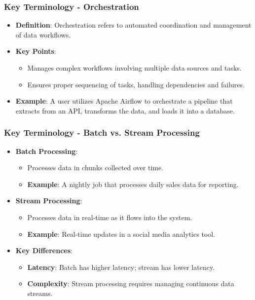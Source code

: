 \documentclass[aspectratio=169]{beamer}
\begin{document}
\begin{frame}[fragile]
    \frametitle{Key Terminology - Orchestration}
    \begin{itemize}
        \item \textbf{Definition}: 
        Orchestration refers to automated coordination and management of data workflows.
        \item \textbf{Key Points}:
        \begin{itemize}
            \item Manages complex workflows involving multiple data sources and tasks.
            \item Ensures proper sequencing of tasks, handling dependencies and failures.
        \end{itemize}
        \item \textbf{Example}: 
        A user utilizes Apache Airflow to orchestrate a pipeline that extracts from an API, transforms the data, and loads it into a database.
    \end{itemize}
\end{frame}

\begin{frame}[fragile]
    \frametitle{Key Terminology - Batch vs. Stream Processing}
    \begin{itemize}
        \item \textbf{Batch Processing}:
        \begin{itemize}
            \item Processes data in chunks collected over time.
            \item \textbf{Example}: A nightly job that processes daily sales data for reporting.
        \end{itemize}
        \item \textbf{Stream Processing}:
        \begin{itemize}
            \item Processes data in real-time as it flows into the system.
            \item \textbf{Example}: Real-time updates in a social media analytics tool.
        \end{itemize}
        \item \textbf{Key Differences}:
        \begin{itemize}
            \item \textbf{Latency}: Batch has higher latency; stream has lower latency.
            \item \textbf{Complexity}: Stream processing requires managing continuous data streams.
        \end{itemize}
    \end{itemize}
\end{frame}
\end{document}

